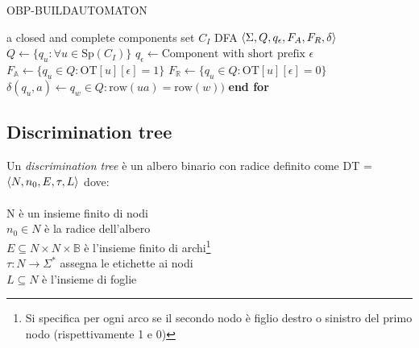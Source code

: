 \begin{algorithm}
\caption{OBP-BUILDAUTOMATON}\label{alg:obp-buildautomaton}
\begin{algorithmic}[1]
\Statex
\Input a closed and complete components set $C_I$
\Output DFA $\Braket{\Sigma,Q,q_\epsilon,F_A,F_R,\delta}$
\State $Q \gets \{q_u :  \forall  u \in \text{Sp}(C_I)\}$
\State $q_\epsilon \gets \text{Component with short prefix } \epsilon $  
\State $F_{\mathbb{A}} \gets \{q_u \in Q : \text{OT}[u][\epsilon] = 1\}$
\State $F_{\mathbb{R}} \gets \{q_u \in Q : \text{OT}[u][\epsilon] = 0\}$
      $\delta(q_u,a) \gets q_w \in Q : \text{row}(ua) = \text{row}(w) )$
     \EndFor
\EndFor
\State \textbf{end for}
\State {}
\end{algorithmic}
\end{algorithm}

\subsection{Discrimination tree}
\begin{definizione*}
Un \textit{discrimination tree} è un albero binario con radice definito come \ac{DT} = $\Braket{N,n_0,E,\tau,L}$ dove:\\\\
N è un insieme finito di nodi\\
$n_0 \in N$ è la radice dell'albero\\
$E \subseteq N \times N \times \mathbb{B}$ è l'insieme finito di archi\footnote{Si specifica per ogni arco se il secondo nodo è figlio destro o sinistro del primo nodo (rispettivamente 1 e 0)}\\
$\tau : N \to \Sigma^{*}$ assegna le etichette ai nodi\\
$L \subseteq N$ è l'insieme di foglie 
\end{definizione*}

